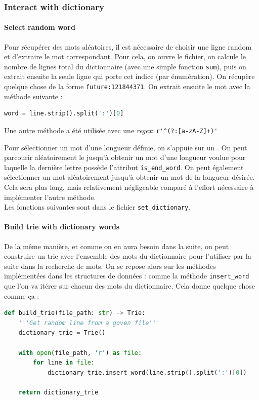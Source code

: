 \documentclass[10pt,a4paper,hidelinks]{article}
\begin{document}
\subsubsection{Interact with dictionary}
\paragraph{Select random word}
Pour récupérer des mots aléatoires, il est nécessaire de choisir une ligne random et d'extraire le mot correspondant. Pour cela, on ouvre le fichier, on calcule le nombre de lignes total du dictionnaire (avec une simple fonction \verb|sum|), puis on extrait ensuite la seule ligne qui porte cet indice (par énumération). On récupère quelque chose de la forme \verb|future:121844371|. On extrait ensuite le mot avec la méthode suivante :
\begin{lstlisting}[language=Python]
word = line.strip().split(':')[0]
\end{lstlisting}
Une autre méthode a été utilisée avec une \textit{regex}: \verb|r'^(?:[a-zA-Z]+)'|

Pour sélectionner un mot d'une longueur définie, on s'appuie sur un . On peut parcourir aléatoirement le  jusqu'à obtenir un mot d'une longueur voulue pour laquelle la dernière lettre possède l'attribut \verb|is_end_word|. On peut également sélectionner un mot aléatoirement jusqu'à obtenir un mot de la longueur désirée. Cela sera plus long, mais relativement négligeable comparé à l'effort nécessaire à implémenter l'autre méthode.\\


Les fonctions suivantes sont dans le fichier \verb|set_dictionary|.
\paragraph{Build trie with dictionary words}
De la même manière, et comme on en aura besoin dans la suite, on peut construire un trie avec l'ensemble des mots du dictionnaire pour l'utiliser par la suite dans la recherche de mots. On se repose alors sur les méthodes implémentées dans les structures de données  : comme la méthode \verb|insert_word| que l'on va itérer sur chacun des mots du dictionnaire. Cela donne quelque chose comme ça :
\begin{lstlisting}[language=Python]
def build_trie(file_path: str) -> Trie:
    '''Get random line from a goven file'''
    dictionary_trie = Trie()

    with open(file_path, 'r') as file:
        for line in file:
            dictionary_trie.insert_word(line.strip().split(':')[0])

    return dictionary_trie
\end{lstlisting}
\end{document}
